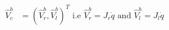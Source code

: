 \begin{enumerate}
\begin{equation}
\begin{split}
	\hat{V}_{c}^{b} &= (\hat{V}_{r}^{b},\hat{V}_{l}^{b})^{T} \text{ i.e } \hat{V}_{r}^{b} = J_{r}\dot{q} \text{ and } \hat{V}_{l}^{b} = J_{l}\dot{q}
\end{split}    
\end{equation}    

\end{enumerate}
